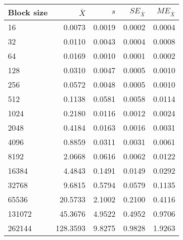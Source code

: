 \begin{tabular}{lrrrr}\toprule
{\small Block size} & $\bar{X}$ & $s$ & $SE_{\bar{X}}$ & $ME_{\bar{X}}$ \\\midrule
16 & 0.0073 & 0.0019 & 0.0002 & 0.0004\\
32 & 0.0110 & 0.0043 & 0.0004 & 0.0008\\
64 & 0.0169 & 0.0010 & 0.0001 & 0.0002\\
128 & 0.0310 & 0.0047 & 0.0005 & 0.0010\\
256 & 0.0572 & 0.0048 & 0.0005 & 0.0010\\
512 & 0.1138 & 0.0581 & 0.0058 & 0.0114\\
1024 & 0.2180 & 0.0116 & 0.0012 & 0.0024\\
2048 & 0.4184 & 0.0163 & 0.0016 & 0.0031\\
4096 & 0.8859 & 0.0311 & 0.0031 & 0.0061\\
8192 & 2.0668 & 0.0616 & 0.0062 & 0.0122\\
16384 & 4.4843 & 0.1491 & 0.0149 & 0.0292\\
32768 & 9.6815 & 0.5794 & 0.0579 & 0.1135\\
65536 & 20.5733 & 2.1002 & 0.2100 & 0.4116\\
131072 & 45.3676 & 4.9522 & 0.4952 & 0.9706\\
262144 & 128.3593 & 9.8275 & 0.9828 & 1.9263\\
\bottomrule
\end{tabular}

